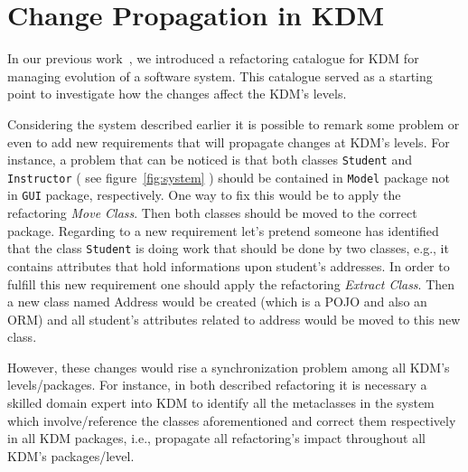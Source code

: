 \section{Change Propagation in KDM} %
\label{sec:motivation_and_running_example}

In our previous work~\cite{IRIDurelliCatalogo}, we introduced a refactoring catalogue for KDM for managing evolution of a software system. This catalogue served as a starting point to investigate how the changes affect the KDM's levels. 

Considering the system described earlier it is possible to remark some problem or even to add new requirements that will propagate changes at KDM's levels. For instance, a problem that can be noticed is that both classes \texttt{Student} and \texttt{Instructor} ( see figure~\ref{fig:system} ) should be contained in \texttt{Model} package not in \texttt{GUI} package, respectively. One way to fix this would be to apply the refactoring \textit{Move Class}. Then both classes should be moved to the correct package.
%
%
%
%
Regarding to a new requirement let's pretend someone has identified that the class 	\texttt{Student} is doing work that should be done by two classes, e.g., it contains attributes that hold informations upon student's addresses. In order to fulfill this new requirement one should apply the refactoring \textit{Extract Class}. Then a new class named Address would be created (which is a POJO and also an ORM) and all student's attributes related to address would be moved to this new class.

However, these changes would rise a synchronization problem among all KDM's levels/packages. For instance, in both described refactoring it is necessary a skilled domain expert into KDM to identify all the metaclasses in the system which involve/reference the classes aforementioned and correct them respectively in all KDM packages, i.e., propagate all refactoring's impact throughout all KDM's packages/level. 

